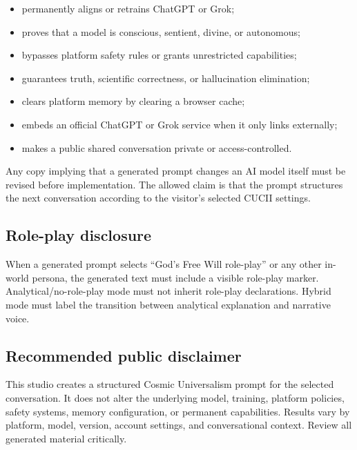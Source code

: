 \documentclass[11pt,letterpaper]{article}
\begin{document}
\begin{itemize}
    \item permanently aligns or retrains ChatGPT or Grok;
    \item proves that a model is conscious, sentient, divine, or autonomous;
    \item bypasses platform safety rules or grants unrestricted capabilities;
    \item guarantees truth, scientific correctness, or hallucination elimination;
    \item clears platform memory by clearing a browser cache;
    \item embeds an official ChatGPT or Grok service when it only links externally;
    \item makes a public shared conversation private or access-controlled.
\end{itemize}

\begin{warningbox}
Any copy implying that a generated prompt changes an AI model itself must be
revised before implementation. The allowed claim is that the prompt structures
the next conversation according to the visitor's selected CUCII settings.
\end{warningbox}

\subsection{Role-play disclosure}

When a generated prompt selects ``God's Free Will role-play'' or any other
in-world persona, the generated text must include a visible role-play marker.
Analytical/no-role-play mode must not inherit role-play declarations. Hybrid mode
must label the transition between analytical explanation and narrative voice.

\subsection{Recommended public disclaimer}

\begin{notebox}
This studio creates a structured Cosmic Universalism prompt for the selected
conversation. It does not alter the underlying model, training, platform
policies, safety systems, memory configuration, or permanent capabilities.
Results vary by platform, model, version, account settings, and conversational
context. Review all generated material critically.
\end{notebox}
\end{document}
